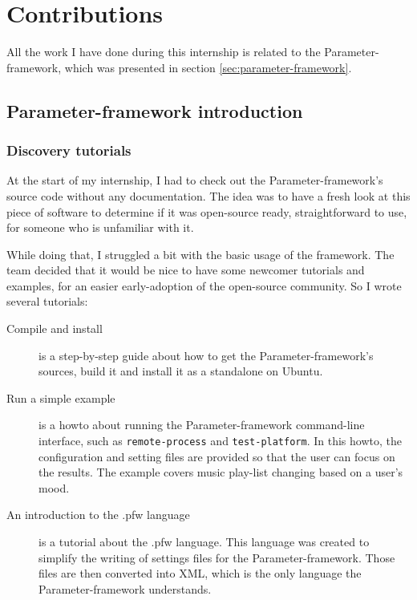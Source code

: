 \chapter{Contributions}\label{chap:contributions}

\begin{sectionIntro}
    All the work I have done during this internship is related
    to the Parameter-framework, which was presented in section \ref{sec:parameter-framework}.
\end{sectionIntro}

\section{Parameter-framework introduction}
\subsection{Discovery tutorials}\label{sec:tutorials}

At the start of my internship, I had to check out the Parameter-framework's
source code without any documentation. The idea was to have a fresh look at
this piece of software to determine if it was open-source ready, straightforward
to use, for someone who is unfamiliar with it.

While doing that, I struggled a bit with the basic usage of the framework. The
team decided that it would be nice to have some newcomer tutorials and examples,
for an easier early-adoption of the open-source community. So I wrote several
tutorials:
\begin{description}
    \item[Compile and install]
        is a step-by-step guide about how to get the Parameter-framework's sources,
        build it and install it as a standalone on Ubuntu.
    \item[Run a simple example]
        is a howto about running the Parameter-framework command-line interface,
        such as \lstinline{remote-process} and \lstinline {test-platform}.  In
        this howto, the configuration and setting files are provided so that
        the user can focus on the results. The example covers music play-list
        changing based on a user's mood.
    \item[An introduction to the .pfw language]\label{desc:pfw-language}
        is a tutorial about the .pfw language. This language was
        created to simplify the writing of settings files for the
        Parameter-framework. Those files are then converted into XML, which is
        the only language the Parameter-framework understands.
\end{description}

